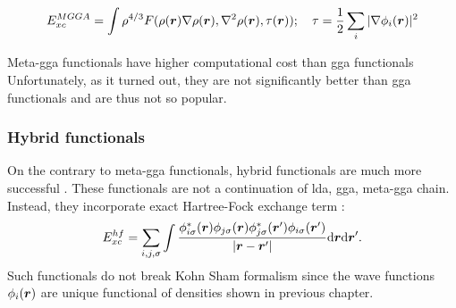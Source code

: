 \documentclass[openany, longbibliography,slovene,a4paper,12pt]{article}
\def\vec#1{\mbox{\boldmath$#1$}}
\newcommand{\dif}{\mathrm{d}}
\begin{document}
\begin{equation}
  E_{xc}^{MGGA}= \int \rho^{4/3}F(\rho(\vec r) \nabla \rho(\vec r), \nabla^2 \rho(\vec r), \tau(\vec r)); \quad \tau=\frac{1}{2}\sum_i |\nabla \phi_i(\vec r)|^2
   \end{equation}

Meta-gga functionals have higher computational cost than gga functionals
Unfortunately, as it turned out, they are not significantly better than gga
functionals and are thus not so popular.


\subsubsection{Hybrid functionals}
On the contrary to meta-gga functionals, hybrid functionals are much more
successful \cite{challenges_den_fun_theor}. These functionals are not a
continuation of lda, gga, meta-gga chain. Instead, they incorporate exact
Hartree-Fock exchange term \cite{challenges_den_fun_theor}:
\begin{equation}
  E^{hf}_{xc}=\sum_ {i,j,\sigma}\int\frac{\phi^*_{i\sigma}(\vec r) \phi_{j\sigma}(\vec r) \phi^*_{j\sigma}(\vec r') \phi_{i\sigma}(\vec r')}{|\vec r - \vec r'|}\dif \vec r \dif \vec r'.
\end{equation}
Such functionals do not break Kohn Sham formalism since the wave functions
$\phi_i(\vec r)$ are unique functional of densities shown in previous chapter.
\end{document}
